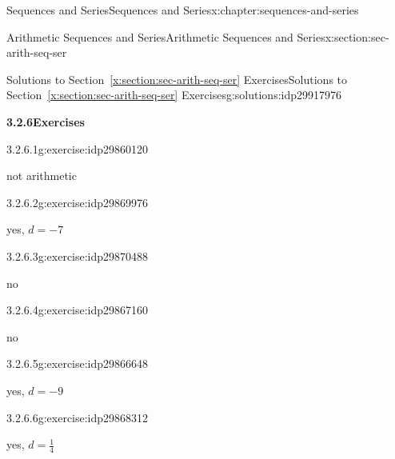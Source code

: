 \documentclass[twoside,10pt,]{book}
\newcommand{\xreffont}{\relax}
\numberwithin{equation}{section}
\begin{document}
\begin{chapterptx}{Sequences and Series}{}{Sequences and Series}{}{}{x:chapter:sequences-and-series}
\begin{sectionptx}{Arithmetic Sequences and Series}{}{Arithmetic Sequences and Series}{}{}{x:section:sec-arith-seq-ser}
\typeout{************************************************}
%
\begin{solutions-subsection}{Solutions to Section~{\xreffont\ref*{x:section:sec-arith-seq-ser}} Exercises}{}{Solutions to Section~{\xreffont\ref*{x:section:sec-arith-seq-ser}} Exercises}{}{}{g:solutions:idp29917976}
\par\medskip
\noindent\textbf{\normalsize{}3.2.6\space\textperiodcentered\space{}Exercises}
\begin{exercisegroup}
\begin{divisionsolutioneg}{3.2.6.1}{}{g:exercise:idp29860120}%
\par\smallskip%
\noindent\hypertarget{g:solution:idp29867544-main}{}not arithmetic\end{divisionsolutioneg}%
\begin{divisionsolutioneg}{3.2.6.2}{}{g:exercise:idp29869976}%
\par\smallskip%
\noindent\hypertarget{g:solution:idp29873432-main}{}yes, \(d=-7\)\end{divisionsolutioneg}%
\begin{divisionsolutioneg}{3.2.6.3}{}{g:exercise:idp29870488}%
\par\smallskip%
\noindent\hypertarget{g:solution:idp29866392-main}{}no\end{divisionsolutioneg}%
\begin{divisionsolutioneg}{3.2.6.4}{}{g:exercise:idp29867160}%
\par\smallskip%
\noindent\hypertarget{g:solution:idp29869464-main}{}no\end{divisionsolutioneg}%
\begin{divisionsolutioneg}{3.2.6.5}{}{g:exercise:idp29866648}%
\par\smallskip%
\noindent\hypertarget{g:solution:idp29872408-main}{}yes, \(d=-9\)\end{divisionsolutioneg}%
\begin{divisionsolutioneg}{3.2.6.6}{}{g:exercise:idp29868312}%
\par\smallskip%
\noindent\hypertarget{g:solution:idp29874456-main}{}yes, \(d=\frac{1}{4}\)\end{divisionsolutioneg}%
\end{exercisegroup}
\par\medskip\noindent
\begin{exercisegroup}
\end{exercisegroup}
\end{solutions-subsection}
\end{sectionptx}
\end{chapterptx}
\end{document}

